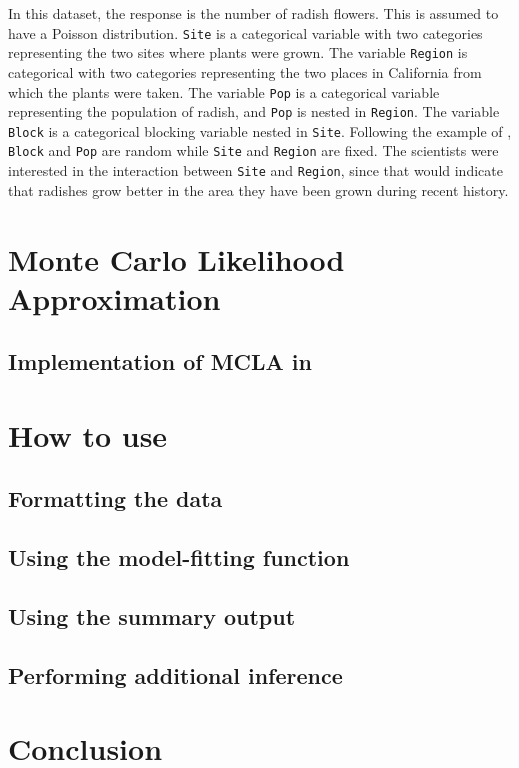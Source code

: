 \documentclass[article]{jss}
\begin{document}
In this dataset, the response is the number of radish flowers. This is assumed to have a Poisson distribution.  \texttt{Site} is a categorical variable with two categories representing the two sites where plants were grown. The variable \texttt{Region} is categorical with two categories representing the two places in California from which the plants were taken. The variable \texttt{Pop} is a categorical variable representing the population of radish, and \texttt{Pop} is nested in \texttt{Region}. The variable \texttt{Block} is a categorical blocking variable nested in \texttt{Site}.  Following the example of \citet{ridley:ellstrand:2010}, \texttt{Block} and \texttt{Pop} are random while \texttt{Site} and \texttt{Region} are fixed. The scientists were interested in  the interaction between \texttt{Site} and \texttt{Region}, since that would indicate that radishes grow better in the area they have been grown during recent history.




\section{Monte Carlo Likelihood Approximation}

\subsection[Implementation of MCLA in glmm]{Implementation of MCLA in  }

\section[How to use glmm]{How to use }\label{sec:howto}


\subsection{Formatting the data}
\subsection{Using the model-fitting function}
\subsection{Using the summary output}
\subsection{Performing additional inference}


\section{Conclusion}


\end{document}
